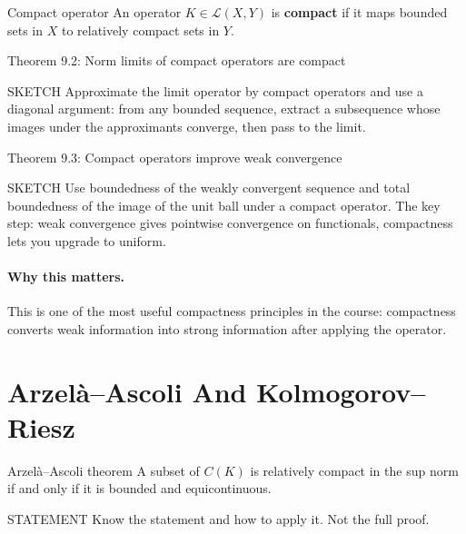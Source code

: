 \documentclass[header={Lecture 7 Exam Study Notes}]{study-note}
\begin{document}
\begin{defbox}{Compact operator}
An operator $K\in\mathcal L(X,Y)$ is \textbf{compact} if it maps bounded sets in $X$ to relatively compact sets in $Y$.
\end{defbox}

\begin{thmbox}{Theorem 9.2: Norm limits of compact operators are compact}
\thmCompactLimit
\end{thmbox}

\begin{prooflevelbox}{SKETCH}
Approximate the limit operator by compact operators and use a diagonal argument: from any bounded sequence, extract a subsequence whose images under the approximants converge, then pass to the limit.
\end{prooflevelbox}

\begin{thmbox}{Theorem 9.3: Compact operators improve weak convergence}
\thmCompactWeakToStrong
\end{thmbox}

\begin{prooflevelbox}{SKETCH}
Use boundedness of the weakly convergent sequence and total boundedness of the image of the unit ball under a compact operator. The key step: weak convergence gives pointwise convergence on functionals, compactness lets you upgrade to uniform.
\end{prooflevelbox}

\paragraph{Why this matters.}
This is one of the most useful compactness principles in the course: compactness converts weak information into strong information after applying the operator.

\section{Arzel\`a--Ascoli And Kolmogorov--Riesz}

\begin{thmbox}{Arzel\`a--Ascoli theorem}
A subset of $C(K)$ is relatively compact in the sup norm if and only if it is bounded and equicontinuous.
\end{thmbox}

\begin{prooflevelbox}{STATEMENT}
Know the statement and how to apply it. Not the full proof.
\end{prooflevelbox}
\end{document}
